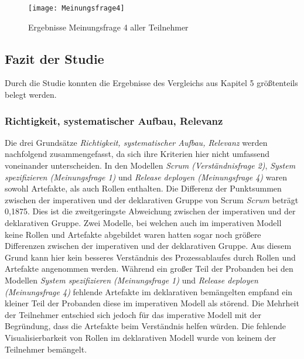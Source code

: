 \begin{figure}[htp]
\begin{center}
  \texttt{[image: Meinungsfrage4]} %
  \caption{Ergebnisse Meinungsfrage 4 aller Teilnehmer}
  \label{fig:Meinungsfrage4}
\end{center}
\end{figure}

\clearpage

\subsection{Fazit der Studie}

Durch die Studie konnten die Ergebnisse des Vergleichs aus Kapitel 5 größtenteils belegt werden.\newline

\subsubsection{Richtigkeit, systematischer Aufbau, Relevanz}


Die drei Grundsätze \textit{Richtigkeit, systematischer Aufbau, Relevanz} werden nachfolgend zusammengefasst, da sich ihre Kriterien hier nicht umfassend voneinander unterscheiden.\newline
In den Modellen \textit{Scrum (Verständnisfrage 2)}, \textit{System spezifizieren (Meinungsfrage 1)} und \textit{Release deployen (Meinungsfrage 4)} waren sowohl Artefakte, als auch Rollen enthalten. Die Differenz der Punktsummen zwischen der imperativen und der deklarativen Gruppe von Scrum \textit{Scrum} beträgt 0,1875. Dies ist die zweitgeringste Abweichung zwischen der imperativen und der deklarativen Gruppe. Zwei Modelle, bei welchen auch im imperativen Modell keine Rollen und Artefakte abgebildet waren hatten sogar noch größere Differenzen zwischen der imperativen und der deklarativen Gruppe. Aus diesem Grund kann hier kein besseres Verständnis des Prozessablaufes durch Rollen und Artefakte angenommen werden. \newline
Während ein großer Teil der Probanden bei den Modellen \textit{System spezifizieren (Meinungsfrage 1)} und \textit{Release deployen (Meinungsfrage 4)} fehlende Artefakte im deklarativen bemängelten empfand ein kleiner Teil der Probanden diese im imperativen Modell als störend. Die Mehrheit der Teilnehmer entschied sich jedoch für das imperative Modell mit der Begründung, dass die Artefakte beim Verständnis helfen würden. Die fehlende Visualisierbarkeit von Rollen im deklarativen Modell wurde von keinem der Teilnehmer bemängelt.\newline



